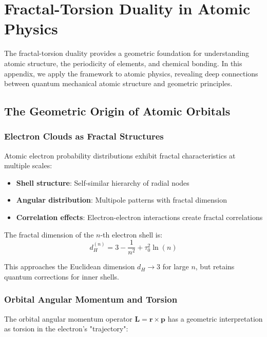 \section{Fractal-Torsion Duality in Atomic Physics}
\label{app:atomic_physics}

The fractal-torsion duality provides a geometric foundation for understanding atomic structure, the periodicity of elements, and chemical bonding. In this appendix, we apply the framework to atomic physics, revealing deep connections between quantum mechanical atomic structure and geometric principles.

\subsection{The Geometric Origin of Atomic Orbitals}

\subsubsection{Electron Clouds as Fractal Structures}

Atomic electron probability distributions exhibit fractal characteristics at multiple scales:
\begin{itemize}
    \item \textbf{Shell structure}: Self-similar hierarchy of radial nodes
    \item \textbf{Angular distribution}: Multipole patterns with fractal dimension
    \item \textbf{Correlation effects}: Electron-electron interactions create fractal correlations
\end{itemize}

The fractal dimension of the $n$-th electron shell is:
\begin{equation}
    d_H^{(n)} = 3 - \frac{1}{n^2} + \tau_0^2 \ln(n)
\end{equation}

This approaches the Euclidean dimension $d_H \to 3$ for large $n$, but retains quantum corrections for inner shells.

\subsubsection{Orbital Angular Momentum and Torsion}

The orbital angular momentum operator $\mathbf{L} = \mathbf{r} \times \mathbf{p}$ has a geometric interpretation as torsion in the electron's "trajectory":

